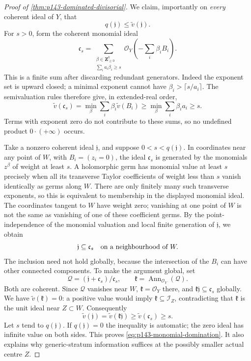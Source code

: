 \begin{proof}[Proof of \cref{thm:p143-dominated-divisorial}]
We claim, importantly on \emph{every} coherent ideal of \(Y\), that
\begin{equation}
                        q(\mathfrak j)\leq\widetilde v(\mathfrak j).
 \label{eq:p143-monomial-domination}
\end{equation}
For \(s>0\), form the coherent monomial ideal
\begin{equation}
 \mathfrak c_s=
 \sum_{\substack{\beta\in\mathbf Z_{\geq0}^k\\
                  \sum_i a_i\beta_i\geq s}}
       \mathcal O_Y\left(-\sum_i\beta_iB_i\right).
 \label{eq:p143-monomial-ideal}
\end{equation}
This is a finite sum after discarding redundant generators.
Indeed the exponent set is upward closed; a minimal exponent cannot
have \(\beta_i>\lceil s/a_i\rceil\). The semivaluation rules therefore
give, in extended-real order,
\begin{equation}
 \widetilde v(\mathfrak c_s)
  =\min_\beta\sum_i\beta_i\widetilde v(B_i)
  \geq\min_\beta\sum_i\beta_i a_i\geq s .
 \label{eq:p143-monomial-ideal-bound}
\end{equation}
Terms with exponent zero do not contribute to these sums, so no
undefined product \(0\cdot(+\infty)\) occurs.

Take a nonzero coherent ideal \(\mathfrak j\), and suppose
\(0<s<q(\mathfrak j)\). In coordinates near any point of \(W\), with
\(B_i=(z_i=0)\), the ideal \(\mathfrak c_s\) is generated by
the monomials \(z^\beta\) of weight at least \(s\).
A holomorphic germ has monomial value at least \(s\) precisely when
all its transverse Taylor coefficients of weight less than \(s\)
vanish identically as germs along \(W\). There are only finitely many
such transverse exponents, so this is equivalent to membership in the
displayed monomial ideal. The coordinates tangent to \(W\) have weight
zero; vanishing at one point of \(W\) is not the same as vanishing of
one of these coefficient germs. By the point-independence of the
monomial valuation and local finite generation of \(\mathfrak j\),
we obtain
\[
                  \mathfrak j\subseteq\mathfrak c_s
                  \quad\hbox{on a neighbourhood of }W.
\]
The inclusion need not hold globally, because the intersection of the
\(B_i\) can have other connected components. To make the argument
global, set
\[
 \mathcal Q=(\mathfrak j+\mathfrak c_s)/\mathfrak c_s,\qquad
 \mathfrak k=\operatorname{Ann}_{\mathcal O_Y}(\mathcal Q).
\]
Both are coherent. Since \(\mathcal Q\) vanishes near \(W\),
\(\mathfrak k=\mathcal O_Y\) there, and
\(\mathfrak k\mathfrak j\subseteq\mathfrak c_s\) globally.
We have \(\widetilde v(\mathfrak k)=0\): a positive value would imply
\(\mathfrak k\subseteq\mathcal I_Z\), contradicting that
\(\mathfrak k\) is the unit ideal near \(Z\subset W\).
Consequently
\[
 \widetilde v(\mathfrak j)
 =\widetilde v(\mathfrak k\mathfrak j)
 \geq\widetilde v(\mathfrak c_s)\geq s .
\]
Let \(s\) tend to \(q(\mathfrak j)\). If \(q(\mathfrak j)=0\) the
inequality is automatic; the zero ideal has infinite value on both
sides. This proves \eqref{eq:p143-monomial-domination}.
It also explains why generic-stratum information suffices at the
possibly smaller actual centre \(Z\).


\end{proof}
